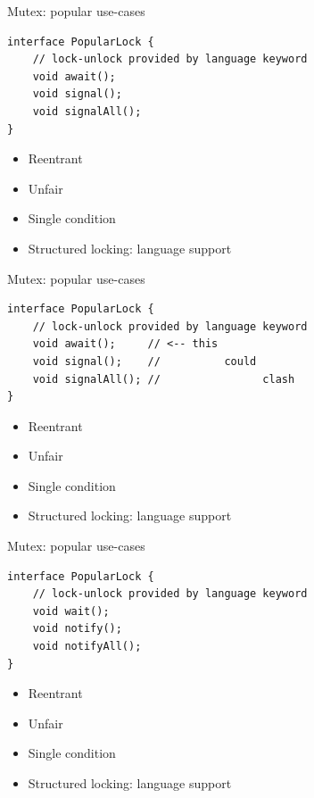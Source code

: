 
\begin{frame}{Mutex: popular use-cases}

\begin{verbatim}
interface PopularLock {
    // lock-unlock provided by language keyword
    void await();
    void signal();
    void signalAll();
}
\end{verbatim}

\begin{itemize}
    \item Reentrant
    \item Unfair
    \item Single condition
    \item Structured locking: language support
\end{itemize}
\end{frame}


\begin{frame}{Mutex: popular use-cases}

\begin{verbatim}
interface PopularLock {
    // lock-unlock provided by language keyword
    void await();     // <-- this
    void signal();    //          could
    void signalAll(); //                clash
}
\end{verbatim}

\begin{itemize}
    \item Reentrant
    \item Unfair
    \item Single condition
    \item Structured locking: language support
\end{itemize}
\end{frame}

\begin{frame}{Mutex: popular use-cases}
\begin{verbatim}
interface PopularLock {
    // lock-unlock provided by language keyword
    void wait();     
    void notify();   
    void notifyAll();
}
\end{verbatim}

\begin{itemize}
    \item Reentrant
    \item Unfair
    \item Single condition
    \item Structured locking: language support
\end{itemize}
\end{frame}

